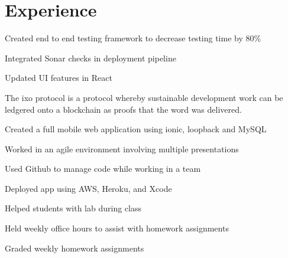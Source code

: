 \documentclass[]{deedy-resume-openfont}
\begin{document}
\begin{minipage}[t]{0.66\textwidth} 


\section{Experience}

\vspace{\topsep} %
\begin{tightemize}
\item Created end to end testing framework to decrease testing time by 80\%
\item Integrated Sonar checks in deployment pipeline
\item Updated UI features in React
\end{tightemize}
\sectionsep



\begin{tightemize}\item The ixo protocol is a protocol whereby sustainable development work can be ledgered onto a blockchain as proofs that the word was delivered. 
\end{tightemize}
\sectionsep

\begin{tightemize}
 \item Created a full mobile web application using ionic, loopback and MySQL \item Worked in an agile environment involving multiple presentations \item Used Github to manage code while working in a team \item Deployed app using AWS, Heroku, and Xcode\end{tightemize}
\sectionsep

\begin{tightemize}
\item Helped students with lab during class \item Held weekly office hours to assist with homework assignments \item Graded weekly homework assignments
\end{tightemize}
\sectionsep


\end{minipage}
\end{document}
